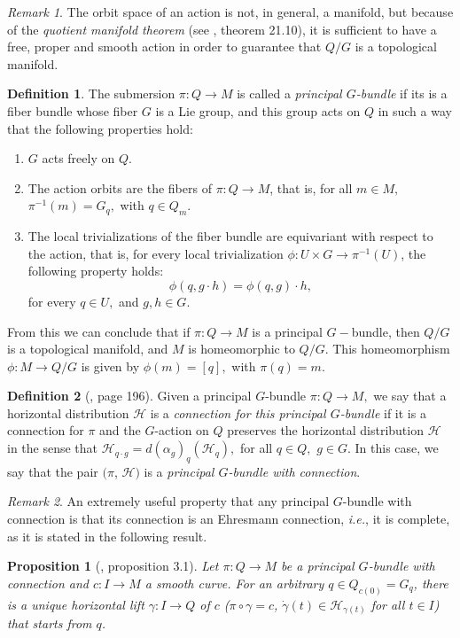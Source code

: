 \documentclass[12pt, letterpaper, reqno]{amsart}
\theoremstyle{definition}
\newtheorem{df}{Definition}
\theoremstyle{plain}
\newtheorem{prop}{Proposition}
\theoremstyle{remark}
\newtheorem{rem}{Remark}
\begin{document}
\begin{rem}
The orbit space of an action is not, in general, a manifold, but because of the \textit{quotient manifold theorem} (see \cite{lee2003introduction}, theorem 21.10), it is sufficient to have a free, proper and smooth action in order to guarantee that $ Q/G $ is a topological manifold.
\end{rem}
\begin{df}
	The submersion $ \pi: Q \rightarrow M$  is called a \textit{principal $ G $-bundle} if its is a fiber bundle whose fiber $ G $ is a Lie group, and this group acts on $ Q $ in such a way that the following properties hold:
	\begin{enumerate}
		\item $ G $ acts freely on $ Q $.
		\item The action orbits are the fibers of $ \pi:Q \rightarrow {M} $, that is, for all $ m\in M, $ $ \pi^{-1}(m) = G_q, $ with $ q\in Q_m. $ 
		\item The local trivializations of the fiber bundle are equivariant with respect to the action, that is, for every local trivialization $ \phi: U \times G \rightarrow \pi^{-1}(U) $, the following property holds: $$ \phi(q, g\cdot h) = \phi(q,g)\cdot h,$$  
			for every $ q\in U, $ and $ g,h\in G. $ 
	\end{enumerate}
\end{df}

From this we can conclude that if $ \pi: Q \rightarrow M $ is a principal $ G- $bundle, then $Q/G  $ is a topological manifold, and $M $ is homeomorphic to $ Q/G $. This homeomorphism $ \phi: M \rightarrow {Q/G}$  is given by $ \phi(m)=[q], $ with $ \pi(q)=m. $ 

\begin{df}[\cite{montgomery2002tour}, page 196]
	Given a principal $ G $-bundle $ \pi: Q \rightarrow M, $ we say that a horizontal distribution $ \mathcal{H} $ is a \textit{connection for this principal $ G $-bundle} if it is a connection for $ \pi $ and the $ G $-action on $ Q $ preserves the horizontal distribution $ \mathcal{H} $ in the sense that $ \mathcal{H}_{q\cdot g} = d(\alpha_g)_q (\mathcal{H}_q), $ for all $ q\in Q, $ $ g\in G $. In this case, we say that the pair $ (\pi$, $ \mathcal{H}) $ is a \textit{principal $ G $-bundle with connection}. 

\end{df}

\begin{rem}
An extremely useful property that any principal $ G $-bundle with connection is that its connection is an Ehresmann connection, \textit{i.e.}, it is complete, as it is stated in the following result. 
\end{rem}
\begin{prop}[\cite{kobayashi1963foundations}, proposition 3.1]\label{prop:comp_bundle}
	Let $ \pi: Q \rightarrow M $ be a principal $ G $-bundle with connection and $ c: I \rightarrow M $ a smooth curve. For an arbitrary $ q\in Q_{c(0)}= G_q $, there is a unique horizontal lift $ \gamma: I \rightarrow Q $ of $ c $ ($\pi\circ\gamma =c$, $ \dot{\gamma}(t)\in \mathcal{H}_{\gamma(t)} $ for all $ t\in I $) that starts from $ q $.    	
\end{prop}
\end{document}
